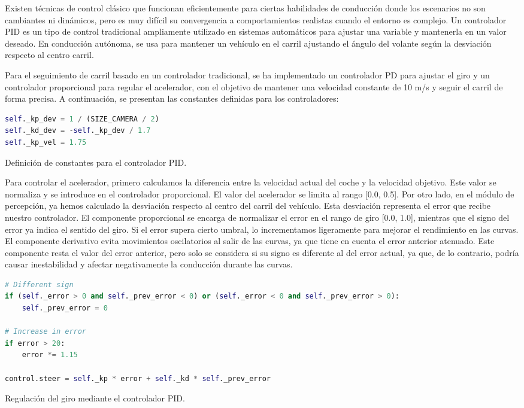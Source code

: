 Existen técnicas de control clásico que funcionan eficientemente para ciertas habilidades de conducción donde los escenarios no son cambiantes ni dinámicos, pero es muy difícil su convergencia a comportamientos realistas cuando el entorno es complejo. Un controlador \ac{PID} es un tipo de control tradicional ampliamente utilizado en sistemas automáticos para ajustar una variable y mantenerla en un valor deseado. En conducción autónoma, se usa para mantener un vehículo en el carril ajustando el ángulo del volante según la desviación respecto al centro carril.

Para el seguimiento de carril basado en un controlador tradicional, se ha implementado un controlador PD para ajustar el giro y un controlador proporcional para regular el acelerador, con el objetivo de mantener una velocidad constante de 10 m/s y seguir el carril de forma precisa. A continuación, se presentan las constantes definidas para los controladores:
\begin{code}[h]
\begin{lstlisting}[language=Python]
self._kp_dev = 1 / (SIZE_CAMERA / 2)
self._kd_dev = -self._kp_dev / 1.7
self._kp_vel = 1.75
\end{lstlisting}
\caption[Definición de constantes para el controlador \ac{PID}]{Definición de constantes para el controlador \ac{PID}.}
\label{cod:const_pid}
\end{code}

Para controlar el acelerador, primero calculamos la diferencia entre la velocidad actual del coche y la velocidad objetivo. Este valor se normaliza y se introduce en el controlador proporcional. El valor del acelerador se limita al rango [0.0, 0.5]. Por otro lado, en el módulo de percepción, ya hemos calculado la desviación respecto al centro del carril del vehículo. Esta desviación representa el error que recibe nuestro controlador. El componente proporcional se encarga de normalizar el error en el rango de giro [0.0, 1.0], mientras que el signo del error ya indica el sentido del giro. Si el error supera cierto umbral, lo incrementamos ligeramente para mejorar el rendimiento en las curvas. El componente derivativo evita movimientos oscilatorios al salir de las curvas, ya que tiene en cuenta el error anterior atenuado. Este componente resta el valor del error anterior, pero solo se considera si su signo es diferente al del error actual, ya que, de lo contrario, podría causar inestabilidad y afectar negativamente la conducción durante las curvas.

\begin{code}[h]
\begin{lstlisting}[language=Python]
# Different sign
if (self._error > 0 and self._prev_error < 0) or (self._error < 0 and self._prev_error > 0):
    self._prev_error = 0       

# Increase in error
if error > 20:
    error *= 1.15

control.steer = self._kp * error + self._kd * self._prev_error
\end{lstlisting}
\caption[Regulación del giro mediante el controlador \ac{PID}]{Regulación del giro mediante el controlador \ac{PID}.}
\label{cod:pid_giro}
\end{code}

